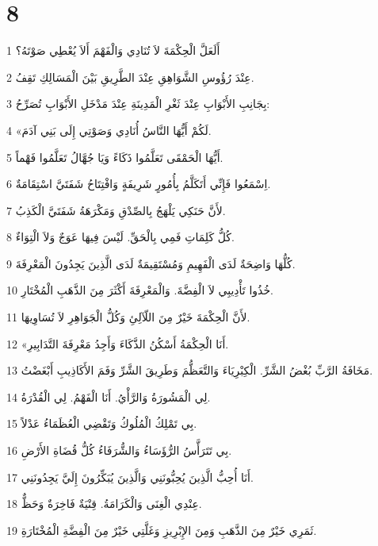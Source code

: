 \chapter{8}

\par 1 أَلَعَلَّ الْحِكْمَةَ لاَ تُنَادِي وَالْفَهْمَ أَلاَ يُعْطِي صَوْتَهُ؟
\par 2 عِنْدَ رُؤُوسِ الشَّوَاهِقِ عِنْدَ الطَّرِيقِ بَيْنَ الْمَسَالِكِ تَقِفُ.
\par 3 بِجَانِبِ الأَبْوَابِ عِنْدَ ثَغْرِ الْمَدِينَةِ عِنْدَ مَدْخَلِ الأَبْوَابِ تُصَرِّحُ:
\par 4 «لَكُمْ أَيُّهَا النَّاسُ أُنَادِي وَصَوْتِي إِلَى بَنِي آدَمَ.
\par 5 أَيُّهَا الْحَمْقَى تَعَلَّمُوا ذَكَاءً وَيَا جُهَّالُ تَعَلَّمُوا فَهْماً.
\par 6 اِسْمَعُوا فَإِنِّي أَتَكَلَّمُ بِأُمُورٍ شَرِيفَةٍ وَافْتِتَاحُ شَفَتَيَّ اسْتِقَامَةٌ.
\par 7 لأَنَّ حَنَكِي يَلْهَجُ بِالصِّدْقِ وَمَكْرَهَةُ شَفَتَيَّ الْكَذِبُ.
\par 8 كُلُّ كَلِمَاتِ فَمِي بِالْحَقِّ. لَيْسَ فِيهَا عَوَجٌ وَلاَ الْتِوَاءٌ.
\par 9 كُلُّهَا وَاضِحَةٌ لَدَى الْفَهِيمِ وَمُسْتَقِيمَةٌ لَدَى الَّذِينَ يَجِدُونَ الْمَعْرِفَةَ.
\par 10 خُذُوا تَأْدِيبِي لاَ الْفِضَّةَ. وَالْمَعْرِفَةَ أَكْثَرَ مِنَ الذَّهَبِ الْمُخْتَارِ.
\par 11 لأَنَّ الْحِكْمَةَ خَيْرٌ مِنَ اللّآلِئِ وَكُلُّ الْجَوَاهِرِ لاَ تُسَاوِيهَا.
\par 12 «أَنَا الْحِكْمَةُ أَسْكُنُ الذَّكَاءَ وَأَجِدُ مَعْرِفَةَ التَّدَابِيرِ.
\par 13 مَخَافَةُ الرَّبِّ بُغْضُ الشَّرِّ. الْكِبْرِيَاءَ وَالتَّعَظُّمَ وَطَرِيقَ الشَّرِّ وَفَمَ الأَكَاذِيبِ أَبْغَضْتُ.
\par 14 لِي الْمَشُورَةُ وَالرَّأْيُ. أَنَا الْفَهْمُ. لِي الْقُدْرَةُ.
\par 15 بِي تَمْلِكُ الْمُلُوكُ وَتَقْضِي الْعُظَمَاءُ عَدْلاً.
\par 16 بِي تَتَرَأَّسُ الرُّؤَسَاءُ وَالشُّرَفَاءُ كُلُّ قُضَاةِ الأَرْضِ.
\par 17 أَنَا أُحِبُّ الَّذِينَ يُحِبُّونَنِي وَالَّذِينَ يُبَكِّرُونَ إِلَيَّ يَجِدُونَنِي.
\par 18 عِنْدِي الْغِنَى وَالْكَرَامَةُ. قِنْيَةٌ فَاخِرَةٌ وَحَظٌّ.
\par 19 ثَمَرِي خَيْرٌ مِنَ الذَّهَبِ وَمِنَ الإِبْرِيزِ وَغَلَّتِي خَيْرٌ مِنَ الْفِضَّةِ الْمُخْتَارَةِ.
